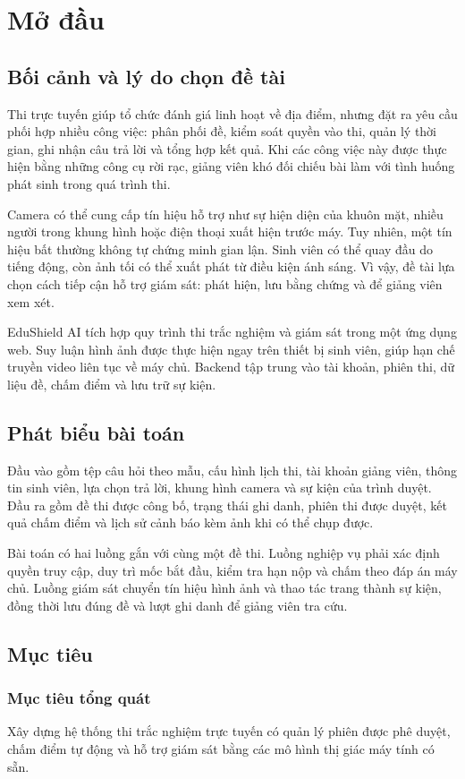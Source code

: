 \chapter{Mở đầu}
\section{Bối cảnh và lý do chọn đề tài}
Thi trực tuyến giúp tổ chức đánh giá linh hoạt về địa điểm, nhưng đặt ra yêu cầu phối hợp nhiều công việc: phân phối đề, kiểm soát quyền vào thi, quản lý thời gian, ghi nhận câu trả lời và tổng hợp kết quả. Khi các công việc này được thực hiện bằng những công cụ rời rạc, giảng viên khó đối chiếu bài làm với tình huống phát sinh trong quá trình thi.

Camera có thể cung cấp tín hiệu hỗ trợ như sự hiện diện của khuôn mặt, nhiều người trong khung hình hoặc điện thoại xuất hiện trước máy. Tuy nhiên, một tín hiệu bất thường không tự chứng minh gian lận. Sinh viên có thể quay đầu do tiếng động, còn ảnh tối có thể xuất phát từ điều kiện ánh sáng. Vì vậy, đề tài lựa chọn cách tiếp cận hỗ trợ giám sát: phát hiện, lưu bằng chứng và để giảng viên xem xét.

EduShield AI tích hợp quy trình thi trắc nghiệm và giám sát trong một ứng dụng web. Suy luận hình ảnh được thực hiện ngay trên thiết bị sinh viên, giúp hạn chế truyền video liên tục về máy chủ. Backend tập trung vào tài khoản, phiên thi, dữ liệu đề, chấm điểm và lưu trữ sự kiện.

\section{Phát biểu bài toán}
Đầu vào gồm tệp câu hỏi theo mẫu, cấu hình lịch thi, tài khoản giảng viên, thông tin sinh viên, lựa chọn trả lời, khung hình camera và sự kiện của trình duyệt. Đầu ra gồm đề thi được công bố, trạng thái ghi danh, phiên thi được duyệt, kết quả chấm điểm và lịch sử cảnh báo kèm ảnh khi có thể chụp được.

Bài toán có hai luồng gắn với cùng một đề thi. Luồng nghiệp vụ phải xác định quyền truy cập, duy trì mốc bắt đầu, kiểm tra hạn nộp và chấm theo đáp án máy chủ. Luồng giám sát chuyển tín hiệu hình ảnh và thao tác trang thành sự kiện, đồng thời lưu đúng đề và lượt ghi danh để giảng viên tra cứu.

\section{Mục tiêu}
\subsection{Mục tiêu tổng quát}
Xây dựng hệ thống thi trắc nghiệm trực tuyến có quản lý phiên được phê duyệt, chấm điểm tự động và hỗ trợ giám sát bằng các mô hình thị giác máy tính có sẵn.

